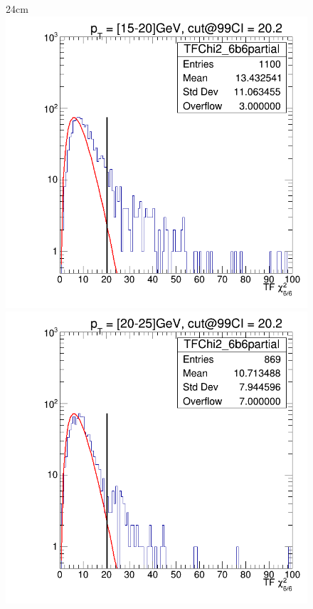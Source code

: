 \begin{landscape}
\begin{figure}[htbp]{24cm}
	\includegraphics[scale=0.25,trim={1cm 0cm 1cm 0cm},clip]{AppendixCMSL1TT/figs/chi2_6b6_15to20_99cut}	
	\includegraphics[scale=0.25,trim={1cm 0cm 1cm 0cm},clip]{AppendixCMSL1TT/figs/chi2_6b6_20to25_99cut}	

\end{figure}
\end{landscape}
